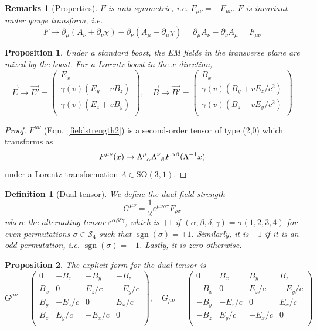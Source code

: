 \documentclass[a4paper]{article}
\DeclareMathOperator{\sgn}{sgn}
\newtheorem{remarks}{Remarks}[section]
\theoremstyle{new}
\newtheorem{defi}{Definition}[section]
\newtheorem{prop}{Proposition}[section]
\begin{document}
\begin{remarks}[Properties]
$F$ is anti-symmetric, i.e. $F_{\mu\nu}=-F_{\mu\nu}$. $F$ is invariant under gauge transform, i.e.
$$F\rightarrow \partial_\mu(A_\nu+\partial_\nu\chi)-\partial_\nu(A_\mu+\partial_\mu\chi)=\partial_\mu A_\nu-\partial_\nu A_\mu=F_{\mu\nu}$$
\end{remarks}
\begin{prop}
Under a standard boost, the EM fields in the transverse plane are mixed by the boost. For a Lorentz boost in the $x$ direction,
\begin{equation}
\vec{E}\rightarrow\vec{E'}=\begin{pmatrix}E_x\\\gamma(v)(E_y-vB_z)\\\gamma(v)(E_z+vB_y)\\\end{pmatrix},\quad\vec{B}\rightarrow\vec{B'}=\begin{pmatrix}B_x\\\gamma(v)(B_y+vE_z/c^2)\\\gamma(v)(B_z-vE_y/c^2)\\\end{pmatrix}\label{transformedfields}
\end{equation}
\end{prop}
\begin{proof}
$F^{\mu\nu}$ (Eqn.~\ref{fieldstrength2}) is a second-order tensor of type (2,0) which transforms as
$$F^{\mu\nu}(x)\rightarrow\tensor*{\Lambda}{*_{}^{\mu}_{\alpha}}\tensor*{\Lambda}{*_{}^{\nu}_{\beta}}F^{\alpha\beta}(\Lambda^{-1}x)$$
under a Lorentz transformation $\Lambda\in\text{SO}(3,1)$.
\end{proof}
\begin{defi}[Dual tensor]
We define the dual field strength
\begin{equation}
G^{\mu\nu}=\frac{1}{2}\varepsilon^{\mu\nu \rho\sigma}F_{\rho\sigma}\label{dual}
\end{equation}
where the alternating tensor $\varepsilon^{\alpha\beta\delta\gamma}$, which is $+1$ if $(\alpha,\beta,\delta,\gamma)=\sigma(1,2,3,4)$ for even permutations $\sigma\in\mathcal{S}_4$ such that $\sgn(\sigma)=+1$. Similarly, it is $-1$ if it is an odd permutation, i.e. $\sgn(\sigma)=-1$. Lastly, it is zero otherwise.
\end{defi}
\begin{prop}
The explicit form for the dual tensor is
\begin{equation}
G^{\mu\nu}=\begin{pmatrix}0&-B_x&-B_y&-B_z\\B_x&0&E_z/c&-E_y/c\\B_y&-E_z/c&0&E_x/c\\B_z&E_y/c&-E_x/c&0\\\end{pmatrix},\quad G_{\mu\nu}=\begin{pmatrix}0&B_x&B_y&B_z\\-B_x&0&E_z/c&-E_y/c\\-B_y&-E_z/c&0&E_x/c\\-B_z&E_y/c&-E_x/c&0\\\end{pmatrix}\label{dual2}
\end{equation}
\end{prop}
\end{document}
